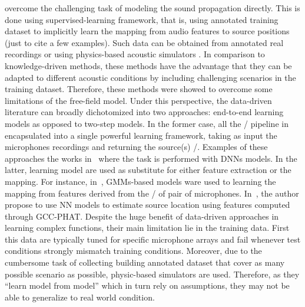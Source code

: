  overcome the challenging task of modeling the sound propagation directly.
This is done using supervised-learning framework, that is, using annotated training dataset to implicitly learn the mapping from audio features to source positions~
(just to cite a few examples).
Such data can be obtained from annotated real recordings  or using physics-based acoustic simulators .
In comparison to knowledge-driven methods, these methods have the advantage that they can be adapted to different acoustic conditions by including challenging scenarios in the training dataset.
Therefore, these methods were showed to overcome some limitations of the free-field model.
Under this perspective, the data-driven literature can broadly dichotomized into two approaches: end-to-end learning models as opposed to two-step models.
In the former case, all the \SSL/ pipeline in encapsulated into a single powerful learning framework, taking as input the microphones recordings and returning the source(s) \DOAs/.
Examples of these approaches the works in~ where the task is performed with \acp{DNN} models.
In the latter, learning model are used as substitute for either feature extraction or the mapping.
For instance, in~, \acp{GMM}-based models ware used to learning the mapping from features derived from the \ReTF/ of pair of microphones.
In~, the author propose to use \ac{NN} models to estimate source location using features computed through \ac{GCC-PHAT}.
Despite the huge benefit of data-driven approaches in learning complex functions, their main limitation lie in the training data.
First this data are typically tuned for specific microphone arrays and fail whenever test conditions strongly mismatch training conditions.
Moreover, due to the cumbersome task of collecting building annotated dataset that cover as many possible scenario as possible, physic-based simulators are used.
Therefore, as they ``learn model from model'' which in turn rely on assumptions, they may not be able to generalize to real world condition.


